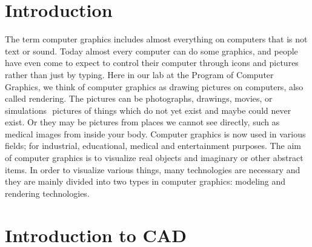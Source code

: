 \section{Introduction}

The  term  computer  graphics  includes  almost  everything  on  computers  that  is  not  text  or  sound.  Today
almost  every  computer  can  do  some  graphics,  and  people  have  even  come  to  expect  to  control  their
computer  through  icons  and  pictures  rather  than  just  by  typing.  Here  in  our  lab  at  the  Program  of
Computer  Graphics,  we  think  of  computer  graphics  as  drawing  pictures  on  computers,  also  called
rendering.  The  pictures  can  be photographs, drawings, movies, or simulations ­­ pictures of things which
do  not  yet  exist  and  maybe  could   never  exist.  Or  they  may  be  pictures  from  places  we  cannot  see
directly,  such  as  medical  images  from  inside  your  body.  Computer  graphics  is  now  used  in  various
fields;  for  industrial,  educational,  medical  and  entertainment  purposes.  The  aim  of  computer  graphics  is
to  visualize  real  objects  and  imaginary  or  other  abstract  items.  In  order to visualize various things, many
technologies  are  necessary  and  they  are  mainly  divided  into  two  types  in  computer  graphics:  modeling
and  rendering  technologies.\\

\section{Introduction to CAD}

